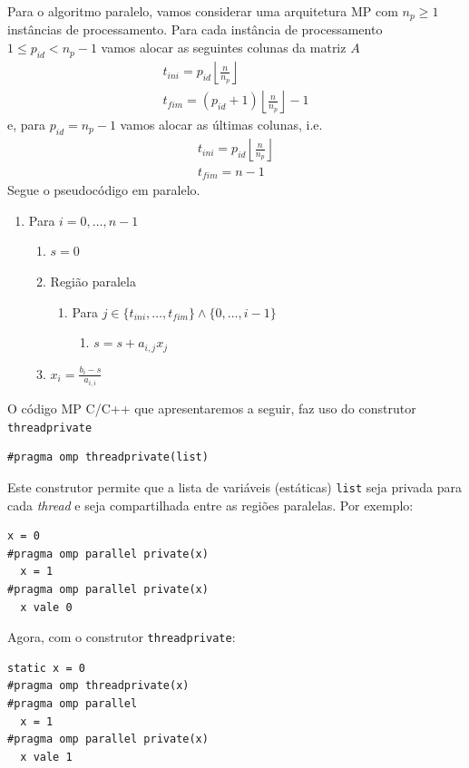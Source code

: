Para o algoritmo paralelo, vamos considerar uma arquitetura MP com $n_p \geq 1$ instâncias de processamento. Para cada instância de processamento $1 \leq p_{id} < n_p-1$ vamos alocar as seguintes colunas da matriz $A$
\begin{gather}
  t_{ini} = p_{id}\left\lfloor\frac{n}{n_p}\right\rfloor\\
  t_{fim} = (p_{id}+1)\left\lfloor\frac{n}{n_p}\right\rfloor-1 
\end{gather}
e, para $p_{id}=n_{p}-1$ vamos alocar as últimas colunas, i.e.
\begin{gather}
  t_{ini} = p_{id}\left\lfloor\frac{n}{n_p}\right\rfloor\\
  t_{fim} = n-1
\end{gather}
Segue o pseudocódigo em paralelo.
\begin{enumerate}
\item Para $i = 0,\dotsc,n-1$
  \begin{enumerate}
  \item $s = 0$
  \item Região paralela
    \begin{enumerate}
    \item Para $j\in\{t_{ini},\dotsc,t_{fim}\}\land\{0,\dotsc,i-1\}$
      \begin{enumerate}
      \item $s = s + a_{i,j}x_{j}$
      \end{enumerate}
    \end{enumerate}
  \item $\displaystyle x_i = \frac{b_i - s}{a_{i,i}}$
  \end{enumerate}
\end{enumerate}

O código MP C/C++ que apresentaremos a seguir, faz uso do construtor \verb+threadprivate+
\begin{verbatim}
#pragma omp threadprivate(list)
\end{verbatim}
Este construtor permite que a lista de variáveis (estáticas) \verb+list+ seja privada para cada {\it thread} e seja compartilhada entre as regiões paralelas. Por exemplo:
\begin{verbatim}
x = 0
#pragma omp parallel private(x)
  x = 1
#pragma omp parallel private(x)
  x vale 0
\end{verbatim}
Agora, com o construtor \verb+threadprivate+:
\begin{verbatim}
static x = 0
#pragma omp threadprivate(x)
#pragma omp parallel
  x = 1
#pragma omp parallel private(x)
  x vale 1
\end{verbatim}

